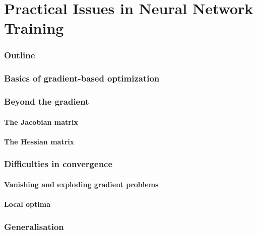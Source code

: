 \renewcommand{\thispart}{5 }
\renewcommand{\thispartname}{Practical Issues in Neural Network Training}

\part{\thispartname}

\section{Outline}




\section{Basics of gradient-based optimization}

\section{Beyond the gradient}
\subsection{The Jacobian matrix}

\subsection{The Hessian matrix}


\section{Difficulties in convergence}

\subsection{Vanishing and exploding gradient problems}
\subsection{Local optima}

\section{Generalisation}


